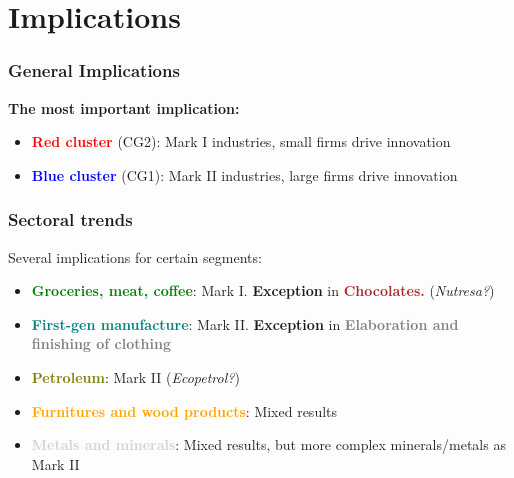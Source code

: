 \documentclass{beamer}
\begin{document}
\section{Implications}
	\begin{frame}
		\frametitle{General Implications}
		\textbf{The most important implication:}
		\begin{itemize}
			\item \textbf{\textcolor{red}{Red cluster}} (CG2): Mark I industries, small firms drive innovation
			\item \textbf{\textcolor{blue}{Blue cluster}} (CG1): Mark II industries, large firms drive innovation
		\end{itemize}
	\end{frame}
	\begin{frame}[allowframebreaks]
		\frametitle{Sectoral trends}
		Several implications for certain segments:
		\begin{itemize}
			\item \textbf{\textcolor{green}{Groceries, meat, coffee}}: Mark I. \textbf{Exception} in \textbf{\textcolor{brown}{Chocolates.}} (\textit{Nutresa?})
			\item \textbf{\textcolor{teal}{First-gen manufacture}}: Mark II. \textbf{Exception} in \textbf{\textcolor{gray}{Elaboration and finishing of clothing}}
			\item \textbf{\textcolor{olive}{Petroleum}}: Mark II (\textit{Ecopetrol?})
			\item \textbf{\textcolor{orange}{Furnitures and wood products}}: Mixed results
			\item \textbf{\textcolor{lightgray}{Metals and minerals}}: Mixed results, but more complex minerals/metals as Mark II
		\end{itemize}
	\end{frame}
\end{document}
